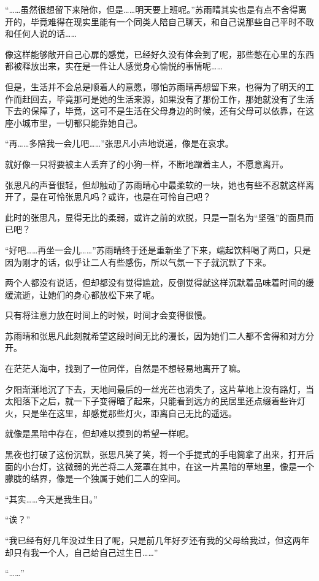 “……虽然很想留下来陪你，但是……明天要上班呢。”苏雨晴其实也是有点不舍得离开的，毕竟难得在现实里能有一个同类人陪自己聊天，和自己说那些自己平时不敢和任何人说的话……

像这样能够敞开自己心扉的感觉，已经好久没有体会到了呢，那些憋在心里的东西都被释放出来，实在是一件让人感觉身心愉悦的事情呢……

但是，生活并不会总是顺着人的意愿，哪怕苏雨晴再想留下来，也得为了明天的工作而赶回去，毕竟那可是她的生活来源，如果没有了那份工作，那她就没有了生活下去的保障了，毕竟，这可不是生活在父母身边的时候，还有父母可以依靠，在这座小城市里，一切都只能靠她自己。

“再……多陪我一会儿吧……”张思凡小声地说道，像是在哀求。

就好像一只将要被主人丢弃了的小狗一样，不断地蹭着主人，不愿意离开。

张思凡的声音很轻，但却触动了苏雨晴心中最柔软的一块，她也有些不忍就这样离开了，是在可怜张思凡吗？或许，也是在可怜自己吧？

此时的张思凡，显得无比的柔弱，或许之前的欢脱，只是一副名为“坚强”的面具而已吧？

“好吧……再坐一会儿……”苏雨晴终于还是重新坐了下来，端起饮料喝了两口，只是因为刚才的话，似乎让二人有些感伤，所以气氛一下子就沉默了下来。

两个人都没有说话，但却都没有觉得尴尬，反倒觉得就这样沉默着品味着时间的缓缓流逝，让她们的身心都放松下来了呢。

只有将注意力放在时间上的时候，时间才会变得很慢。

苏雨晴和张思凡此刻就希望这段时间无比的漫长，因为她们二人都不舍得和对方分开。

在茫茫人海中，找到了一位同伴，自然是不想轻易地离开了嘛。

夕阳渐渐地沉了下去，天地间最后的一丝光芒也消失了，这片草地上没有路灯，当太阳落下之后，就一下子变得暗了起来，只能看到远方的民居里还点缀着些许灯火，只是坐在这里，却感觉那些灯火，距离自己无比的遥远。

就像是黑暗中存在，但却难以摸到的希望一样呢。

黑夜也打破了这份沉默，张思凡笑了笑，将一个手提式的手电筒拿了出来，打开后面的小台灯，这微弱的光芒将二人笼罩在其中，在这一片黑暗的草地里，像是一个朦胧的结界，像是一个独属于她们二人的空间。

“其实……今天是我生日。”

“诶？”

“我已经有好几年没过生日了呢，只是前几年好歹还有我的父母给我过，但这两年却只有我一个人，自己给自己过生日……”

“……”

